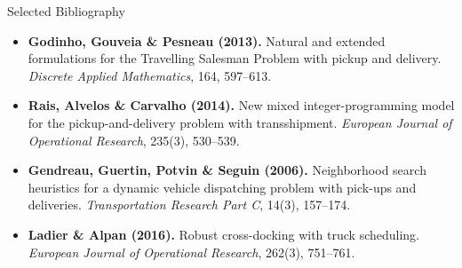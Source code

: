 \documentclass[aspectratio=169,10pt]{beamer}
\begin{document}
\begin{frame}[allowframebreaks]{Selected Bibliography}
\begin{itemize}
    \item \textbf{Godinho, Gouveia \& Pesneau (2013).} Natural and extended formulations
          for the Travelling Salesman Problem with pickup and delivery.
          \textit{Discrete Applied Mathematics}, 164, 597--613.

    \item \textbf{Rais, Alvelos \& Carvalho (2014).} New mixed integer-programming
          model for the pickup-and-delivery problem with transshipment.
          \textit{European Journal of Operational Research}, 235(3), 530--539.

    \item \textbf{Gendreau, Guertin, Potvin \& Seguin (2006).} Neighborhood search
          heuristics for a dynamic vehicle dispatching problem with pick-ups and
          deliveries. \textit{Transportation Research Part C}, 14(3), 157--174.

    \item \textbf{Ladier \& Alpan (2016).} Robust cross-docking with truck scheduling.
          \textit{European Journal of Operational Research}, 262(3), 751--761.
  \end{itemize}
\end{frame}
\end{document}
